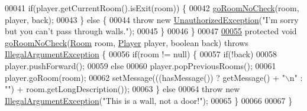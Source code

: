 \begin{DoxyCode}
00041         \textcolor{keywordflow}{if}(player.getCurrentRoom().isExit(room)) \{
00042             \hyperlink{classGoCommand_a3149bf695c19b78c39cfc4dadece7846}{goRoomNoCheck}(room, player, back);
00043         \} \textcolor{keywordflow}{else} \{
00044             \textcolor{keywordflow}{throw} \textcolor{keyword}{new} \hyperlink{classUnauthorizedException}{UnauthorizedException}(\textcolor{stringliteral}{"I'm sorry but you can't pass through
       walls."});
00045         \}
00046     \}
00047 
\hypertarget{GoCommand_8java_source_l00055}{}\hyperlink{classGoCommand_a3149bf695c19b78c39cfc4dadece7846}{00055}     \textcolor{keyword}{protected} \textcolor{keywordtype}{void} \hyperlink{classGoCommand_a3149bf695c19b78c39cfc4dadece7846}{goRoomNoCheck}(\hyperlink{classRoom}{Room} room, \hyperlink{classPlayer}{Player} player, \textcolor{keywordtype}{boolean} back) \textcolor{keywordflow}{throws} 
      \hyperlink{classIllegalArgumentException}{IllegalArgumentException} \{
00056         \textcolor{keywordflow}{if}(room != null) \{
00057             \textcolor{keywordflow}{if}(!back)
00058                 player.pushForward();
00059             \textcolor{keywordflow}{else}
00060                 player.popPreviousRooms();
00061             player.goRoom(room);
00062             setMessage(((hasMessage()) ? getMessage() + \textcolor{stringliteral}{"\(\backslash\)n"} : \textcolor{stringliteral}{""}) + room.getLongDescription());
00063         \} \textcolor{keywordflow}{else}
00064             \textcolor{keywordflow}{throw} \textcolor{keyword}{new} \hyperlink{classIllegalArgumentException}{IllegalArgumentException}(\textcolor{stringliteral}{"This is a wall, not a door!"});
00065     \}
00066 
00067 \}
\end{DoxyCode}
